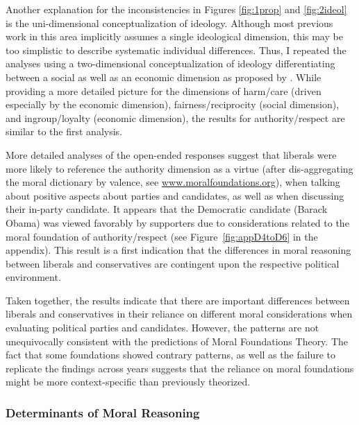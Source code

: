 \documentclass[12pt]{article}
\begin{document}
Another explanation for the inconsistencies in Figures \ref{fig:1prop} and \ref{fig:2ideol} is the uni-dimensional conceptualization of ideology. Although most previous work in this area implicitly assumes a single ideological dimension, this may be too simplistic to describe systematic individual differences. Thus, I repeated the analyses using a two-dimensional conceptualization of ideology differentiating between a social as well as an economic dimension as proposed by \citet[see Figure~\ref{fig:appD2soceco}]{feldman2014understanding}. While providing a more detailed picture for the dimensions of harm/care (driven especially by the economic dimension), fairness/reciprocity (social dimension), and ingroup/loyalty (economic dimension), the results for authority/respect are similar to the first analysis.



More detailed analyses of the open-ended responses suggest that liberals were more likely to reference the authority dimension as a virtue (after dis-aggregating the moral dictionary by valence, see \url{www.moralfoundations.org}), when talking about positive aspects about parties and candidates, as well as when discussing their in-party candidate. It appears that the Democratic candidate (Barack Obama) was viewed favorably by supporters due to considerations related to the moral foundation of authority/respect (see Figure~\ref{fig:appD4toD6} in the appendix). This result is a first indication that the differences in moral reasoning between liberals and conservatives are contingent upon the respective political environment.

Taken together, the results indicate that there are important differences between liberals and conservatives in their reliance on different moral considerations when evaluating political parties and candidates. However, the patterns are not unequivocally consistent with the predictions of Moral Foundations Theory. The fact that some foundations showed contrary patterns, as well as the failure to replicate the findings across years suggests that the reliance on moral foundations might be more context-specific than previously theorized.


\subsubsection{Determinants of Moral Reasoning}
\end{document}
